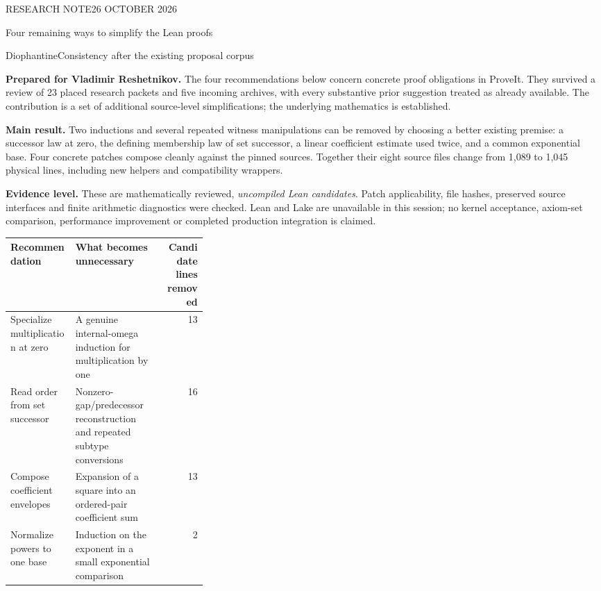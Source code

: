 \documentclass[11pt,letterpaper]{article}
\begin{document}
\thispagestyle{empty}
{\sffamily\small\color{teal} RESEARCH NOTE\hfill 26 OCTOBER 2026\par}
\vspace{0.7cm}
{\sffamily\bfseries\Huge\color{ink}\raggedright Four remaining ways to simplify the Lean proofs\par}
\vspace{0.25cm}

{\Large\sffamily DiophantineConsistency after the existing proposal corpus\par}
\vspace{0.45cm}

\textbf{Prepared for Vladimir Reshetnikov.} The four recommendations below concern concrete proof obligations in ProveIt. They survived a review of 23 placed research packets and five incoming archives, with every substantive prior suggestion treated as already available. The contribution is a set of additional source-level simplifications; the underlying mathematics is established.

\medskip
\colorbox{pale}{\parbox{\dimexpr\linewidth-2\fboxsep\relax}{
\textbf{Main result.} Two inductions and several repeated witness manipulations can be removed by choosing a better existing premise: a successor law at zero, the defining membership law of set successor, a linear coefficient estimate used twice, and a common exponential base. Four concrete patches compose cleanly against the pinned sources. Together their eight source files change from 1,089 to 1,045 physical lines, including new helpers and compatibility wrappers.

\textbf{Evidence level.} These are mathematically reviewed, \emph{uncompiled Lean candidates}. Patch applicability, file hashes, preserved source interfaces and finite arithmetic diagnostics were checked. Lean and Lake are unavailable in this session; no kernel acceptance, axiom-set comparison, performance improvement or completed production integration is claimed.
}}

\vspace{0.5cm}
\begin{tabularx}{\linewidth}{@{}>{\raggedright\arraybackslash}p{0.33\linewidth}Xr@{}}
\toprule
Recommendation & What becomes unnecessary & Candidate lines removed\\
\midrule
Specialize multiplication at zero & A genuine internal-omega induction for multiplication by one & 13\\
Read order from set successor & Nonzero-gap/predecessor reconstruction and repeated subtype conversions & 16\\
Compose coefficient envelopes & Expansion of a square into an ordered-pair coefficient sum & 13\\
Normalize powers to one base & Induction on the exponent in a small exponential comparison & 2\\
\bottomrule
\end{tabularx}
\end{document}
